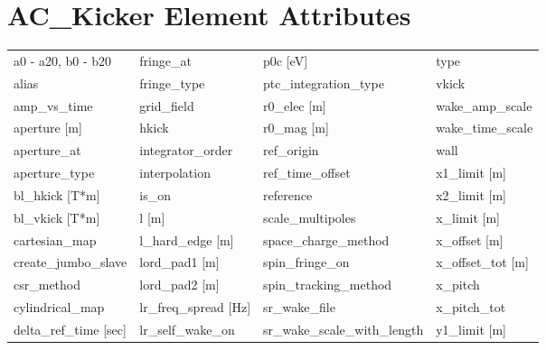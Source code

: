  \section{AC_Kicker Element Attributes}
 \label{s:list.ac.kicker}
 
 \begin{tabular}{llll} \toprule
a0 - a20, b0 - b20             & fringe_at                      & p0c [eV]                       & type                           \\
alias                          & fringe_type                    & ptc_integration_type           & vkick                          \\
amp_vs_time                    & grid_field                     & r0_elec [m]                    & wake_amp_scale                 \\
aperture [m]                   & hkick                          & r0_mag [m]                     & wake_time_scale                \\
aperture_at                    & integrator_order               & ref_origin                     & wall                           \\
aperture_type                  & interpolation                  & ref_time_offset                & x1_limit [m]                   \\
bl_hkick [T*m]                 & is_on                          & reference                      & x2_limit [m]                   \\
bl_vkick [T*m]                 & l [m]                          & scale_multipoles               & x_limit [m]                    \\
cartesian_map                  & l_hard_edge [m]                & space_charge_method            & x_offset [m]                   \\
create_jumbo_slave             & lord_pad1 [m]                  & spin_fringe_on                 & x_offset_tot [m]               \\
csr_method                     & lord_pad2 [m]                  & spin_tracking_method           & x_pitch                        \\
cylindrical_map                & lr_freq_spread [Hz]            & sr_wake_file                   & x_pitch_tot                    \\
delta_ref_time [sec]           & lr_self_wake_on                & sr_wake_scale_with_length      & y1_limit [m]                   \\

\end{tabular}
